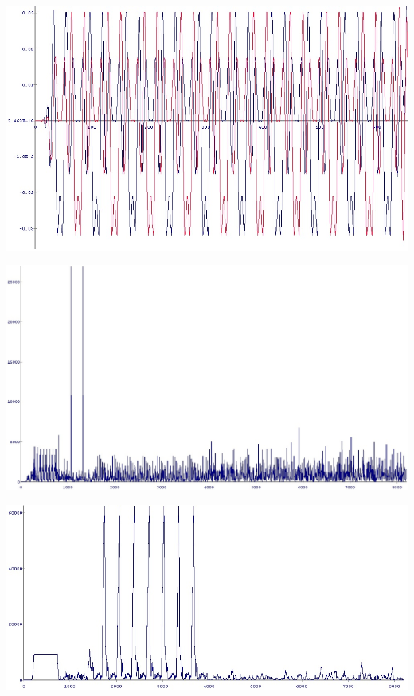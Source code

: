 \begin{center}
\includegraphics[width=\textwidth]{content/fig/sts_chipscope.JPG}
\label{sts_chipscope}
\end{center}

\begin{center}
\includegraphics[width=\textwidth]{content/fig/crosscorr.JPG}
\label{crosscorr}
\end{center}

\begin{center}
\includegraphics[width=\textwidth]{content/fig/autocorr.JPG}
\label{autocorr}
\end{center}

